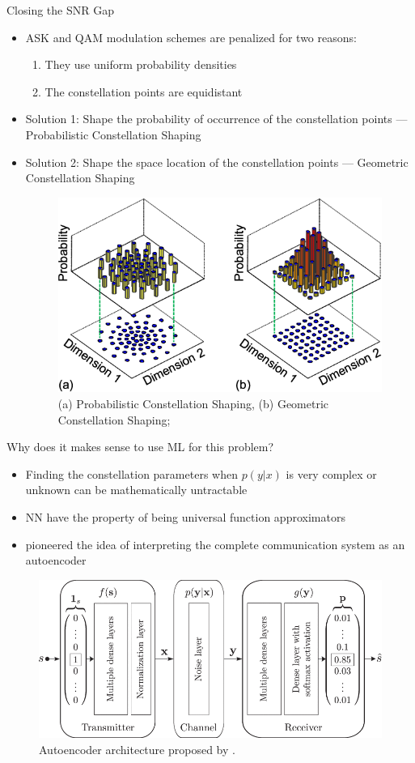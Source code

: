 \documentclass[english,aspectratio=1610,9pt,helvet,nicetitles]{ICEbeamerTUMCD}
\begin{document}
\begin{frame}{Closing the SNR Gap}
	\begin{itemize}
	\item ASK and QAM modulation schemes are penalized for two reasons:
	\begin{enumerate}
		\item They use uniform probability densities
		\item The constellation points are equidistant
	\end{enumerate}
	\item Solution 1: Shape the probability of occurrence of the constellation points --- Probabilistic Constellation Shaping
	\item Solution 2: Shape the space location of the constellation points --- Geometric Constellation Shaping
	\begin{figure}
	\includegraphics[width=0.4\columnwidth]{ressources/PCS_GCS.png}
	\caption{(a) Probabilistic Constellation Shaping, (b) Geometric Constellation Shaping; \cite{Cho2019ProbabilisticCS}}
	\end{figure}
	\end{itemize}

\end{frame}

\begin{frame}{Why does it makes sense to use ML for this problem?}
\begin{itemize}
\item Finding the constellation parameters when $p(y|x)$ is very complex or unknown can be mathematically untractable
\item NN have the property of being universal function approximators \cite{HORNIK1989359}
\item \citet{O'Shea} pioneered the idea of interpreting the complete communication system as an autoencoder
\end{itemize}
\begin{figure}
\includegraphics[width=0.5\columnwidth]{ressources/oshea.png}
\caption{Autoencoder architecture proposed by \citep{O'Shea}.}
\end{figure}
\end{frame}
\end{document}
